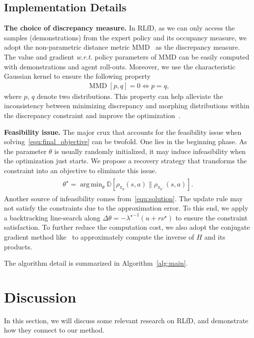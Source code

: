 \documentclass[letterpaper]{article} %
\DeclareMathOperator*{\argmin}{arg\,min}
\begin{document}
\subsection{Implementation Details}\label{sec:imple}
\noindent
\textbf{The choice of discrepancy measure.} In RLfD, as we can only access the samples (demonstrations) from the expert policy and its occupancy measure, we adopt the non-parametric distance metric MMD~\cite{mmd1,mmd2,mmd3} as the discrepancy measure. The value and gradient \emph{w.r.t.} policy parameters of MMD can be easily computed with demonstrations and agent roll-outs. Moreover, we use the characteristic Gaussian kernel to ensure the following property
\begin{align}
    \operatorname{MMD}[p, q] = 0 \Leftrightarrow p = q\text{,}
\end{align}
where $p$, $q$ denote two distributions. This property can help alleviate the inconsistency between minimizing discrepancy and morphing distributions within the discrepancy constraint and improve the optimization~\cite{mmd_same}.

\noindent
\textbf{Feasibility issue.} The major crux that accounts for the feasibility issue when solving~\eqref{equ:final_objective} can be twofold. One lies in the beginning phase. As the parameter $\theta$ is usually randomly initialized, it may induce infeasibility when the optimization just starts. We propose a recovery strategy that transforms the constraint into an objective to eliminate this issue.
\begin{align}
\begin{split}\label{equ:recovery}
    \theta^\star = \argmin_\theta \mathbb{D}\left[\rho_{\pi_\theta}(s,a) \| \rho_{\pi_{\theta^-}}(s,a)\right]\text{.}
\end{split}
\end{align}
Another source of infeasibility comes from~\eqref{equ:solution}. The update rule may not satisfy the constraints due to the approximation error. To this end, we apply a backtracking line-search along $\Delta\theta = -{\lambda^{\star}}^{-1}(u + r\nu^\star)$ to ensure the constraint satisfaction. To further reduce the computation cost, we also adopt the conjugate gradient method like~\cite{trpo} to approximately compute the inverse of $H$ and its products.

The algorithm detail is summarized in Algorithm~\ref{alg:main}.

\section{Discussion}\label{sec:discuss}
In this section, we will discuss some relevant research on RLfD, and demonstrate how they connect to our method.
\end{document}
